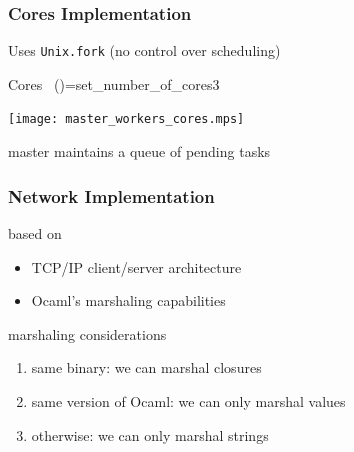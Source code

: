 \documentclass[xcolor=dvipsnames]{beamer}
\let\emph\alert
\begin{document}
\begin{frame}\frametitle {Cores Implementation}
  Uses \texttt{Unix.fork} (no control over scheduling)

  

\medskip\noindent
{\colorbox{tmpcolor}{\begin{minipage}{\textwidth}\ttfamily\parindent 0pt

\noindent{}\hspace*{1.22ex}Cores~\linebreak
\noindent{}\hspace*{1.22ex}()\hspace*{1.22ex}=\hspace*{1.22ex}set\_{}number\_{}of\_{}cores\hspace*{1.22ex}3
\end{minipage}}}


\medskip\noindent

  \begin{center}
    \texttt{[image: master\_workers\_cores.mps]}
  \end{center}

  master maintains a queue of pending tasks
  
\end{frame}



\begin{frame}\frametitle {Network Implementation}
  based on
  \begin{itemize}
  \item TCP/IP client/server architecture
  \item Ocaml's marshaling capabilities
  \end{itemize}
  
  \vfill
  marshaling considerations
  \begin{enumerate}
  \item \emph{same binary}: we can marshal closures
  \item \emph{same version of Ocaml}: we can only marshal values
  \item \emph{otherwise}: we can only marshal strings
  \end{enumerate}
  
\end{frame}
\end{document}
